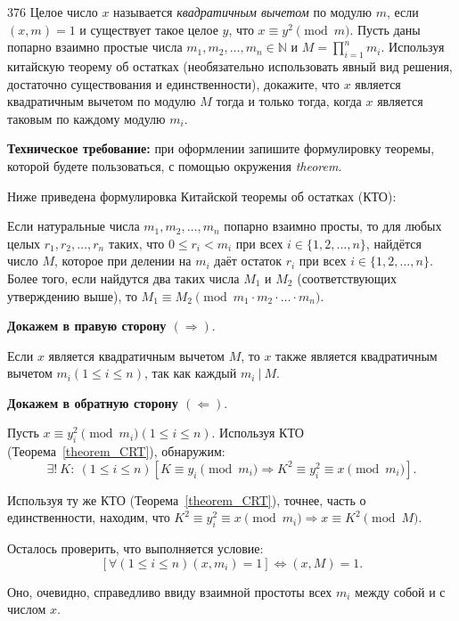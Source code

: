 \begin{task}{376}
Целое число \(x\) называется \emph{квадратичным вычетом} по модулю \(m\), если \((x, m)=1\) и существует такое целое \(y\), что \(x \equiv y^2 \pmod{m}\). Пусть даны попарно взаимно простые числа \(m_1,m_2,\dots,m_n\in \mathbb{N}\) и \(M=\prod_{i=1}^n m_i\). Используя китайскую теорему об остатках (необязательно использовать явный вид решения, достаточно существования и единственности), докажите, что \(x\) является квадратичным вычетом по модулю \(M\) тогда и только тогда, когда \(x\) является таковым по каждому модулю \(m_i\). 

\textbf{Техническое требование:} при оформлении запишите формулировку теоремы, которой будете пользоваться, с помощью окружения \emph{theorem}.
\end{task}

\begin{solution}

Ниже приведена формулировка Китайской теоремы об остатках (КТО):
\begin{theorem}\label{theorem_CRT}
Если натуральные числа \(m_{1}, m_{2}, \dots, m_{n}\) попарно взаимно просты, то для любых целых \(r_{1}, r_{2}, \dots, r_{n}\) таких, что \(0 \leqslant r_{i} < m_{i}\) при всех \(i \in \{1, 2, \dots, n\}\), найдётся число \(M\), которое при делении на \(m_{i}\) даёт остаток \(r_{i}\) при всех \(i \in \{1, 2, \dots, n\}\). Более того, если найдутся два таких числа \(M_1\) и \(M_2\) (соответствующих утверждению выше), то \(M_{1} \equiv M_{2}{\pmod  {m_{1} \cdot m_{2} \cdot \ldots \cdot m_{n}}}\).
\end{theorem}

\textbf{Докажем в правую сторону \((\Rightarrow)\)}.

Если \(x\) является квадратичным вычетом \(M\), то \(x\) также является квадратичным вычетом \(m_i \left(1 \leqslant i \leqslant n \right)\), так как каждый \(m_i \: | \: M\).

\textbf{Докажем в обратную сторону \((\Leftarrow)\)}.

Пусть \(x \equiv y_i^2 \pmod{m_i} \left(1 \leqslant i \leqslant n \right)\). Используя КТО (Теорема~\ref{theorem_CRT}), обнаружим:
\begin{equation*}
    \exists! \: K: \: \left(1 \leqslant i \leqslant n \right) \left[ K \equiv y_i \pmod{m_i} \Rightarrow K^2 \equiv y_i^2 \equiv x \pmod{m_i} \right]. 
\end{equation*}

Используя ту же КТО (Теорема~\ref{theorem_CRT}), точнее, часть о единственности, находим, что \(K^2 \equiv y_i^2 \equiv x \pmod{m_i} \Rightarrow x \equiv K^2 \pmod{M}\).

Осталось проверить, что выполняется условие:
\begin{equation*}
    \left[ \forall \left(1 \leqslant i \leqslant n \right) (x, m_i) = 1 \right] \Leftrightarrow (x, M) = 1.
\end{equation*}

Оно, очевидно, справедливо ввиду взаимной простоты всех \(m_i\) между собой и с числом \(x\).

\end{solution}
